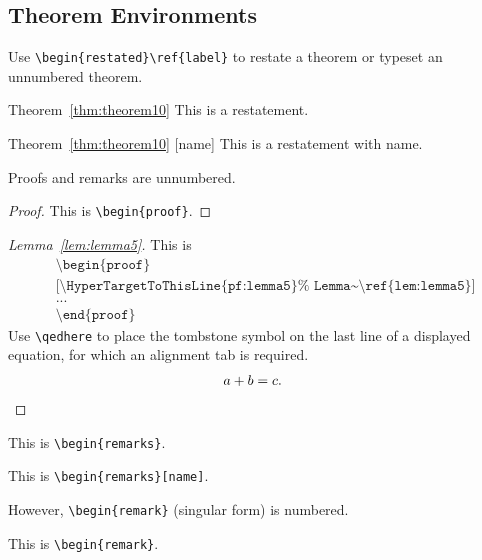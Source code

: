 \subsection{Theorem Environments}

Use
\texttt{\textbackslash begin\{restated\}{\textbackslash ref\{label\}}}
to restate a theorem or typeset an unnumbered theorem.

\begin{restated}{Theorem~\ref{thm:theorem10}}
This is a restatement.
\end{restated}

\begin{restated}
{Theorem~\ref{thm:theorem10}}
[name]
This is a restatement with name.
\end{restated}

\noindent
Proofs and remarks are unnumbered.

\begin{proof}
This is \texttt{\textbackslash begin\{proof\}}.
\end{proof}

\begin{proof}
[Lemma~\ref{lem:lemma5}]
This is
\begin{align*}
&\texttt{\textbackslash begin\{proof\}}\\%
&\texttt{[\textbackslash HyperTargetToThisLine\{pf:lemma5\}%
Lemma\textasciitilde\textbackslash ref\{lem:lemma5\}]}\\
&\texttt{...}\\
&\texttt{\textbackslash end\{proof\}}
\end{align*}
Use \texttt{\textbackslash qedhere} to place the tombstone symbol
on the last line of a displayed equation,
for which an alignment tab is required.
\begin{align*}
a+b&{}=c.
\qedhere
\end{align*}
\end{proof}

\begin{remarks}
This is \texttt{\textbackslash begin\{remarks\}}.
\end{remarks}

\begin{remarks}
[name]
This is \texttt{\textbackslash begin\{remarks\}[name]}.
\end{remarks}

\noindent
However, \texttt{\textbackslash begin\{remark\}} (singular form) is numbered.

\begin{remark}
This is \texttt{\textbackslash begin\{remark\}}.
\end{remark}

